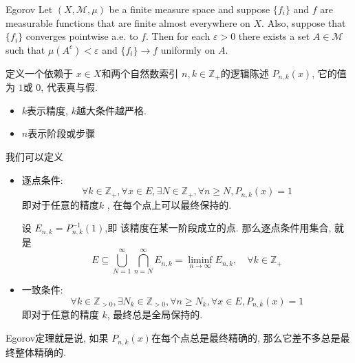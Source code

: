 \documentclass[../main.tex]{subfiles}
\begin{document}
\begin{theorem}{Egorov}{}
Let $(X, \mathcal{M}, \mu)$ be a finite measure space and suppose $\{f_i\}$ and $f$ are measurable functions that are finite almost everywhere on $X$. Also, suppose that $\{f_i\}$ converges pointwise a.e. to $f$. Then for each $\varepsilon > 0$ there exists a set $A \in \mathcal{M}$ such that $\mu(A^{c}) < \varepsilon$ and $\{f_i\} \to f$ uniformly on $A$.
\end{theorem}
\begin{remark}
    定义一个依赖于 \(  x \in X  \)和两个自然数索引 \(  n,k \in \mathbb{Z} _{+ }  \)的逻辑陈述 \(  P_{n,k}\left( x \right)   \), 它的值为 \(  1  \)或 \(  0  \), 代表真与假.  
    \begin{itemize}
        \item \(  k  \)表示精度,  \(  k  \)越大条件越严格.
        \item \(  n  \)表示阶段或步骤   
    \end{itemize}
       我们可以定义
       \begin{itemize}
        \item 逐点条件: \[
        \forall k \in \mathbb{Z} _{+ }, \forall x\in E, \exists N \in \mathbb{Z} _{+ }, \forall n\ge N, P_{n,k}\left( x \right)= 1 
        \]即对于任意的精度\(  k  \) , 在每个点上可以最终保持的.

        设 \(  E_{n,k}=  P_{n,k}^{-1} \left( 1 \right)   \),即 该精度在某一阶段成立的点. 那么逐点条件用集合, 就是 \[
        E\subseteq   \bigcup _{N= 1}^{\infty}\bigcap _{n = N}^{\infty}E_{n,k}= \liminf _{n\to \infty}E_{n,k},\quad \forall k \in \mathbb{Z} _{+ }
        \]
        \item 一致条件: \[
        \forall k \in \mathbb{Z} _{> 0}, \exists N_{k}\in \mathbb{Z} _{> 0},  \forall n\ge N_{k}, \forall x\in E, P_{n,k}\left( x \right)= 1 
        \]即对于任意的精度 \(  k  \), 最终总是全局保持的. 
       \end{itemize}
       

       Egorov定理就是说, 如果 \(  P_{n,k}\left( x \right)   \)在每个点总是最终精确的, 那么它差不多总是最终整体精确的. 
\end{remark}
\end{document}
